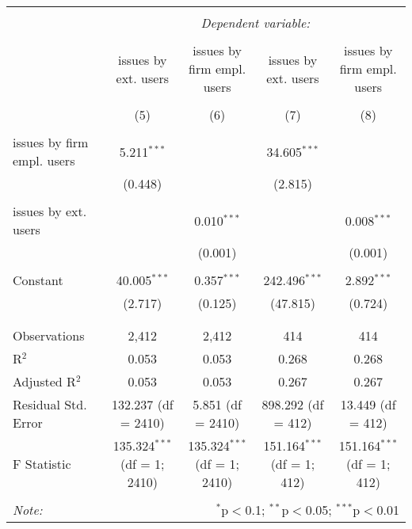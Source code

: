 
\begin{tabular}{@{\extracolsep{5pt}}lcccc}
\\[-1.8ex]\hline
\hline \\[-1.8ex]
 & \multicolumn{4}{c}{\textit{Dependent variable:}} \\
\cline{2-5}
\\[-1.8ex] & issues by ext. users & issues by firm empl. users & issues by ext. users & issues by firm empl. users \\
\\[-1.8ex] & (5) & (6) & (7) & (8)\\
\hline \\[-1.8ex]
 issues by firm empl. users & 5.211$^{***}$ &  & 34.605$^{***}$ &  \\
  & (0.448) &  & (2.815) &  \\
  & & & & \\
 issues by ext. users &  & 0.010$^{***}$ &  & 0.008$^{***}$ \\
  &  & (0.001) &  & (0.001) \\
  & & & & \\
 Constant & 40.005$^{***}$ & 0.357$^{***}$ & 242.496$^{***}$ & 2.892$^{***}$ \\
  & (2.717) & (0.125) & (47.815) & (0.724) \\
  & & & & \\
\hline \\[-1.8ex]
Observations & 2,412 & 2,412 & 414 & 414 \\
R$^{2}$ & 0.053 & 0.053 & 0.268 & 0.268 \\
Adjusted R$^{2}$ & 0.053 & 0.053 & 0.267 & 0.267 \\
Residual Std. Error & 132.237 (df = 2410) & 5.851 (df = 2410) & 898.292 (df = 412) & 13.449 (df = 412) \\
F Statistic & 135.324$^{***}$ (df = 1; 2410) & 135.324$^{***}$ (df = 1; 2410) & 151.164$^{***}$ (df = 1; 412) & 151.164$^{***}$ (df = 1; 412) \\
\hline
\hline \\[-1.8ex]
\textit{Note:}  & \multicolumn{4}{r}{$^{*}$p$<$0.1; $^{**}$p$<$0.05; $^{***}$p$<$0.01} \\
\end{tabular}
